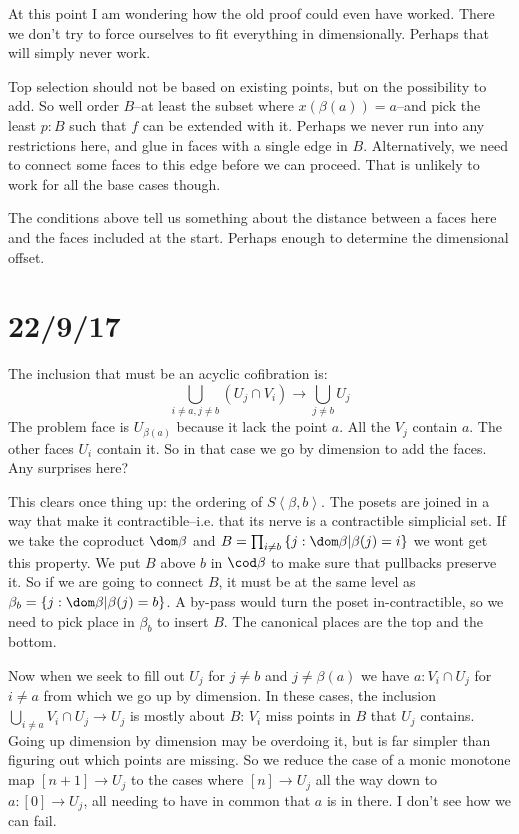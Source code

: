 \documentclass{tac}
\newcommand\set[1]{\left\{#1\right\}}
\newcommand\of{:}
\newcommand\tuplet[1]{\left\langle #1 \right\rangle}
\begin{document}
At this point I am wondering how the old proof could even have worked. There we don't try to force ourselves to fit everything in dimensionally.
Perhaps that will simply never work.

Top selection should not be based on existing points, but on the possibility to add.
So well order $B$--at least the subset where $x(\beta(a)) = a$--and pick the least $p\of B$ such that $f$ can be extended with it.
Perhaps we never run into any restrictions here, and glue in faces with a single edge in $B$.
Alternatively, we need to connect some faces to this edge before we can proceed.
That is unlikely to work for all the base cases though.

The conditions above tell us something about the distance between a faces here and the faces included at the start. Perhaps enough to determine the dimensional offset.


\section{22/9/17}
The inclusion that must be an acyclic cofibration is:
\[ \bigcup_{i\neq a,j\neq b}(U_j\cap V_i) \to \bigcup_{j\neq b}U_j\]
The problem face is $U_{\beta(a)}$ because it lack the point $a$. All the $V_j$ contain $a$. The other faces $U_i$ contain it. So in that case we go by dimension to add the faces. Any surprises here?

This clears once thing up: the ordering of $S\tuplet{\beta,b}$. The posets are joined in a way that make it contractible--i.e. that its nerve is a contractible simplicial set. If we take the coproduct $\dom\beta$ and $B = \prod_{i\neq b}\set{j\of\dom\beta|\beta(j)=i}$ we wont get this property. We put $B$ above $b$ in $\cod\beta$ to make sure that pullbacks preserve it. So if we are going to connect $B$, it must be at the same level as $\beta_b = \set{j\of\dom\beta|\beta(j)=b}$. A by-pass would turn the poset in-contractible, so we need to pick place in $\beta_b$ to insert $B$. The canonical places are the top and the bottom.

Now when we seek to fill out $U_j$ for $j\neq b$ and $j\neq \beta(a)$ we
have $a\of V_i\cap U_j$ for $i\neq a$ from which we go up by dimension. 
In these cases, the inclusion $\bigcup_{i\neq a} V_i\cap U_j \to U_j$ is
mostly about $B$: $V_i$ miss points in $B$ that $U_j$ contains. Going up dimension by dimension may be overdoing it, but is far simpler than figuring out which points are missing. So we reduce the case of a monic monotone map $[n + 1]\to U_j$ to the cases where $[n]\to U_j$ all the way down to $a:[0]\to U_j$, all needing to have in common that $a$ is in there. I don't see how we can fail.
\end{document}
